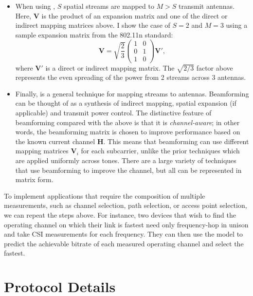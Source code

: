\begin{itemize}
	\item When using , $S$ spatial streams are mapped to $M > S$ transmit antennas. Here, $\mathbf{V}$ is the product of an expansion matrix and one of the direct or indirect mapping matrices above. I show the case of $S=2$ and $M=3$ using a sample expansion matrix from the 802.11n standard:
	\begin{equation*}
		\tag{$3\times2$ Spatial Expansion}
		\mathbf{V} = \sqrt{\frac{2}{3}}\begin{pmatrix}
		1 & 0\\
		0 & 1\\
		1 & 0
		\end{pmatrix}\mathbf{V}',
	\end{equation*}
	where $\mathbf{V}'$ is a direct or indirect mapping matrix. The $\sqrt{2/3}$ factor above represents the even spreading of the power from 2 streams across 3 antennas.
	
	\item Finally,  is a general technique for mapping streams to antennas. Beamforming can be thought of as a synthesis of indirect mapping, spatial expansion (if applicable) and transmit power control. The distinctive feature of beamforming compared with the above is that it is \emph{channel-aware}; in other words, the beamforming matrix is chosen to improve performance based on the known current channel $\mathbf{H}$. This means that beamforming can use different mapping matrices $\mathbf{V}_i$ for each subcarrier, unlike the prior techniques which are applied uniformly across tones. There are a large variety of techniques that use beamforming to improve the channel, but all can be represented in matrix form.
\end{itemize}

 To implement applications that require the composition of multiple measurements, such as channel selection, path selection, or access point selection, we can repeat the steps above. For instance, two devices that wish to find the operating channel on which their link is fastest need only frequency-hop in unison and take CSI measurements for each frequency. They can then use the model to predict the achievable bitrate of each measured operating channel and select the fastest.

\section{Protocol Details}

